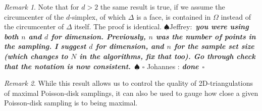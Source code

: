 \documentclass[preprint, 10pt]{elsarticle}
\newif\ifnotesw \noteswtrue
\newcommand{\jeffrey}[1]{\ifnotesw  \textcolor[rgb]{0,0,1}{  $\spadesuit$Jeffrey:\ {\sf \bf \it #1}\ $\spadesuit$ }\fi}
\newcommand{\johannes}[1]{\ifnotesw  \textcolor[rgb]{1,0,1}{ $\square$ Johannes : {\sf \bf \it #1}\ $\square$ }\fi}
\theoremstyle{definition}
\theoremstyle{remark}
\newtheorem*{remark}{Remark}
\begin{document}
\begin{remark}
	Note that for $d>2$ the same result is true, if we assume the circumcenter of the $d$-simplex, of which $\Delta$ is a face, is contained in $\Omega$ instead of the circumcenter of $\Delta$ itself. The proof is identical.  
    \jeffrey{you were using both $n$ and $d$ for dimension. Previously, $n$ was the number of points in the sampling. I suggest $d$ for dimension, and $n$ for the sample set size (which changes to $N$ in the algorithms, fix that too). Go through check that the notation is now consistent.} \johannes{done}	
\end{remark}

\begin{remark}
	While this result allows us to control the quality of 2D-triangulations of maximal Poisson-disk samplings, it can also be used to gauge how close a given Poisson-disk sampling is to being maximal.
\end{remark}
\end{document}
